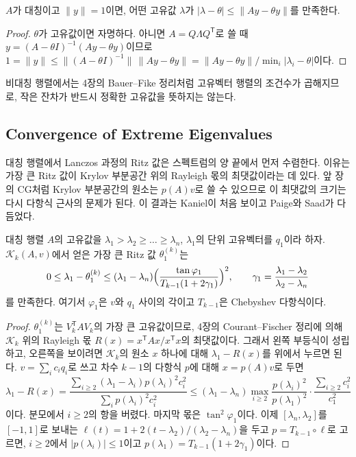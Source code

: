 \begin{proposition}
\label{prop:ritz-residual}
$A$가 대칭이고 $\|y\|=1$이면, 어떤 고유값 $\lambda$가 $|\lambda-\theta|\le\|Ay-\theta y\|$를 만족한다.
\end{proposition}

\begin{proof}
$\theta$가 고유값이면 자명하다. 아니면 $A=Q\Lambda Q^{\mathsf T}$로 쓸 때 $y=(A-\theta I)^{-1}(Ay-\theta y)$이므로 $1=\|y\|\le\|(A-\theta I)^{-1}\|\,\|Ay-\theta y\|=\|Ay-\theta y\|/\min_i|\lambda_i-\theta|$이다.
\end{proof}

비대칭 행렬에서는 4장의 Bauer--Fike 정리처럼 고유벡터 행렬의 조건수가 곱해지므로, 작은 잔차가 반드시 정확한 고유값을 뜻하지는 않는다.

\subsection{Convergence of Extreme Eigenvalues}

대칭 행렬에서 Lanczos 과정의 Ritz 값은 스펙트럼의 양 끝에서 먼저 수렴한다. 이유는 가장 큰 Ritz 값이 Krylov 부분공간 위의 Rayleigh 몫의 최댓값이라는 데 있다. 앞 장의 CG처럼 Krylov 부분공간의 원소는 $p(A)v$로 쓸 수 있으므로 이 최댓값의 크기는 다시 다항식 근사의 문제가 된다. 이 결과는 Kaniel이 처음 보이고 Paige와 Saad가 다듬었다\cite{kaniel1966,saad1980rates}.

\begin{theorem}
\label{thm:kps}
대칭 행렬 $A$의 고유값을 $\lambda_1>\lambda_2\ge\dots\ge\lambda_n$, $\lambda_1$의 단위 고유벡터를 $q_1$이라 하자. $\mathcal K_k(A,v)$에서 얻은 가장 큰 Ritz 값 $\theta_1^{(k)}$는
\[
0\le\lambda_1-\theta_1^{(k)}\le(\lambda_1-\lambda_n)\Bigl(\frac{\tan\varphi_1}{T_{k-1}(1+2\gamma_1)}\Bigr)^2,\qquad\gamma_1=\frac{\lambda_1-\lambda_2}{\lambda_2-\lambda_n}
\]
를 만족한다. 여기서 $\varphi_1$은 $v$와 $q_1$ 사이의 각이고 $T_{k-1}$은 Chebyshev 다항식이다.
\end{theorem}

\begin{proof}
$\theta_1^{(k)}$는 $V_k^{\mathsf T}AV_k$의 가장 큰 고유값이므로, 4장의 Courant--Fischer 정리에 의해 $\mathcal K_k$ 위의 Rayleigh 몫 $R(x)=x^{\mathsf T}Ax/x^{\mathsf T}x$의 최댓값이다. 그래서 왼쪽 부등식이 성립하고, 오른쪽을 보이려면 $\mathcal K_k$의 원소 $x$ 하나에 대해 $\lambda_1-R(x)$를 위에서 누르면 된다. $v=\sum_ic_iq_i$로 쓰고 차수 $k-1$의 다항식 $p$에 대해 $x=p(A)v$로 두면
\[
\lambda_1-R(x)=\frac{\sum_{i\ge2}(\lambda_1-\lambda_i)p(\lambda_i)^2c_i^2}{\sum_ip(\lambda_i)^2c_i^2}\le(\lambda_1-\lambda_n)\max_{i\ge2}\frac{p(\lambda_i)^2}{p(\lambda_1)^2}\cdot\frac{\sum_{i\ge2}c_i^2}{c_1^2}
\]
이다. 분모에서 $i\ge2$의 항을 버렸다. 마지막 몫은 $\tan^2\varphi_1$이다. 이제 $[\lambda_n,\lambda_2]$를 $[-1,1]$로 보내는 $\ell(t)=1+2(t-\lambda_2)/(\lambda_2-\lambda_n)$을 두고 $p=T_{k-1}\circ\ell$로 고르면, $i\ge2$에서 $|p(\lambda_i)|\le1$이고 $p(\lambda_1)=T_{k-1}(1+2\gamma_1)$이다.
\end{proof}

